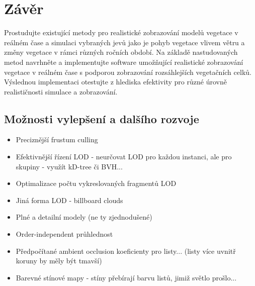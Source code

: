 \chapter{Závěr}
\label{chap:zaver}


Prostudujte existující metody pro realistické zobrazování modelů vegetace v reálném čase a simulaci vybraných jevů jako je pohyb vegetace vlivem větru a změny vegetace v rámci různých ročních období. Na základě nastudovaných metod navrhněte a implementujte software umožňující realistické zobrazování vegetace v reálném čase s podporou zobrazování rozsáhlejších vegetačních celků. Výslednou implementaci otestujte z hlediska efektivity pro různé úrovně realističnosti simulace a zobrazování.

\section{Možnosti vylepšení a dalšího rozvoje}

\begin{itemize}

\item Preciznější frustum culling

\item Efektivnější řízení LOD - neurčovat LOD pro každou instanci, ale pro skupiny - využít kD-tree či BVH...

\item Optimalizace počtu vykreslovaných fragmentů LOD

\item Jiná forma LOD - billboard clouds

%
\item Plné a detailní modely (ne ty zjednodušené)

\item Order-independent průhlednost

\item Předpočítané ambient occlusion koeficienty pro listy... (listy více uvnitř koruny by měly být tmavší)

\item Barevné stínové mapy - stíny přebírají barvu listů, jimiž světlo prošlo...





\end{itemize}